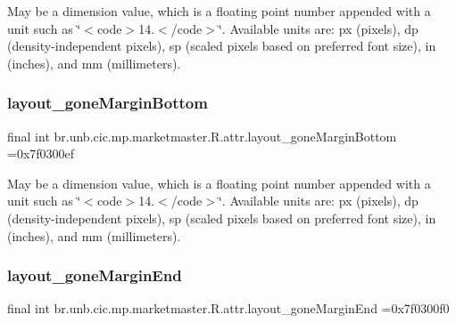 May be a dimension value, which is a floating point number appended with a unit such as \char`\"{}$<$code$>$14.\+5sp$<$/code$>$\char`\"{}. Available units are\+: px (pixels), dp (density-\/independent pixels), sp (scaled pixels based on preferred font size), in (inches), and mm (millimeters). \mbox{\label{classbr_1_1unb_1_1cic_1_1mp_1_1marketmaster_1_1R_1_1attr_a5e6b4fcdbbc3ecd2d8632bc16769a425}} 
\subsubsection{\texorpdfstring{layout\+\_\+gone\+Margin\+Bottom}{layout\_goneMarginBottom}}
{\footnotesize\ttfamily final int br.\+unb.\+cic.\+mp.\+marketmaster.\+R.\+attr.\+layout\+\_\+gone\+Margin\+Bottom =0x7f0300ef\hspace{0.3cm}{\ttfamily [static]}}

May be a dimension value, which is a floating point number appended with a unit such as \char`\"{}$<$code$>$14.\+5sp$<$/code$>$\char`\"{}. Available units are\+: px (pixels), dp (density-\/independent pixels), sp (scaled pixels based on preferred font size), in (inches), and mm (millimeters). \mbox{\label{classbr_1_1unb_1_1cic_1_1mp_1_1marketmaster_1_1R_1_1attr_a46dcf5ded55fedd00d8476ca1e985f1b}} 
\subsubsection{\texorpdfstring{layout\+\_\+gone\+Margin\+End}{layout\_goneMarginEnd}}
{\footnotesize\ttfamily final int br.\+unb.\+cic.\+mp.\+marketmaster.\+R.\+attr.\+layout\+\_\+gone\+Margin\+End =0x7f0300f0\hspace{0.3cm}{\ttfamily [static]}}

